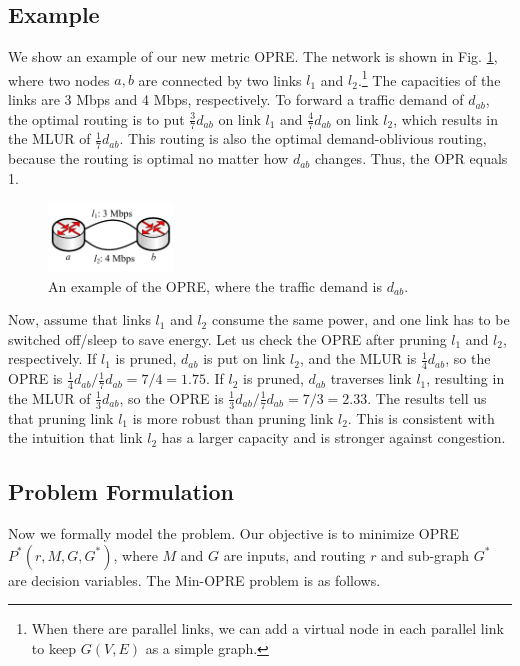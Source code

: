 \documentclass[conference]{IEEEtran}
\begin{document}
\subsection{Example}

We show an example of our new metric OPRE. The network is shown in Fig. \ref{figure_an_example_of_opre}, where two nodes $a, b$ are connected by two links $l_1$ and $l_2$.{\footnote{When there are parallel links, we can add a virtual node in each parallel link to keep $G(V,E)$ as a simple graph.}} The capacities of the links are 3 Mbps and 4 Mbps, respectively. To forward a traffic demand of $d_{ab}$, the optimal routing is to put $\frac{3}{7}d_{ab}$ on link $l_1$ and $\frac{4}{7}d_{ab}$ on link $l_2$, which results in the MLUR of $\frac{1}{7}d_{ab}$. This routing is also the optimal demand-oblivious routing, because the routing is optimal no matter how $d_{ab}$ changes. Thus, the OPR equals 1.

\begin{figure}[!t]
\centering
\includegraphics[width=1.3in]{3-nodes-example}
\vspace{-0.15in}
\caption{An example of the OPRE, where the traffic demand is $d_{ab}$.}
\label{figure_an_example_of_opre}
\end{figure}

Now, assume that links $l_1$ and $l_2$ consume the same power, and one link has to be switched off/sleep to save energy. Let us check the OPRE after pruning $l_1$ and $l_2$, respectively. If $l_1$ is pruned, $d_{ab}$ is put on link $l_2$, and the MLUR is $\frac{1}{4}d_{ab}$, so the OPRE is $\frac{1}{4}d_{ab}/\frac{1}{7}d_{ab} = 7/4 = 1.75$. If $l_2$ is pruned, $d_{ab}$ traverses link $l_1$, resulting in the MLUR of $\frac{1}{3}d_{ab}$, so the OPRE is $\frac{1}{3}d_{ab}/\frac{1}{7}d_{ab} = 7/3 = 2.33$. The results tell us that pruning link $l_1$ is more robust than pruning link $l_2$. This is consistent with the intuition that link $l_2$ has a larger capacity and is stronger against congestion.

\subsection{Problem Formulation}

Now we formally model the problem. Our objective is to minimize OPRE $P^*(r, M, G, G^*)$, where $M$ and $G$ are inputs, and routing $r$ and sub-graph $G^*$ are decision variables. The Min-OPRE problem is as follows.
\end{document}
